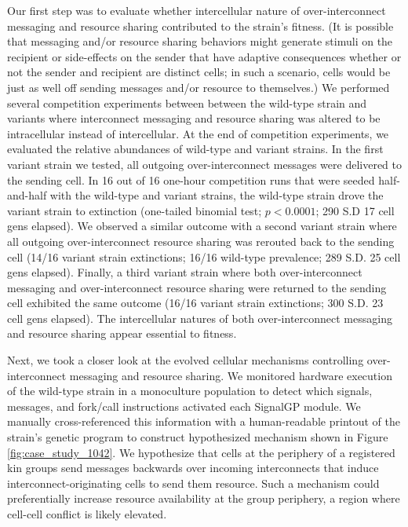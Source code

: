 Our first step was to evaluate whether intercellular nature of over-interconnect messaging and resource sharing contributed to the strain's fitness.
(It is possible that messaging and/or resource sharing behaviors might generate stimuli on the recipient or side-effects on the sender that have adaptive consequences whether or not the sender and recipient are distinct cells;
in such a scenario, cells would be just as well off sending messages and/or resource to themselves.)
We performed several competition experiments between between the wild-type strain and variants where interconnect messaging and resource sharing was altered to be intracellular instead of intercellular.
At the end of competition experiments, we evaluated the relative abundances of wild-type and variant strains.
In the first variant strain we tested, all outgoing over-interconnect messages were delivered to the sending cell.
In 16 out of 16 one-hour competition runs that were seeded half-and-half with the wild-type and variant strains, the wild-type strain drove the variant strain to extinction (one-tailed binomial test; $p < 0.0001$; 290 S.D 17 cell gens elapsed).
We observed a similar outcome with a second variant strain where all outgoing over-interconnect resource sharing was rerouted back to the sending cell (14/16 variant strain extinctions; 16/16 wild-type prevalence; 289 S.D. 25 cell gens elapsed).
Finally, a third variant strain where both over-interconnect messaging and over-interconnect resource sharing were returned to the sending cell exhibited the same outcome (16/16 variant strain extinctions; 300 S.D. 23 cell gens elapsed).
The intercellular natures of both over-interconnect messaging and resource sharing appear essential to fitness.

Next, we took a closer look at the evolved cellular mechanisms controlling over-interconnect messaging and resource sharing.
We monitored hardware execution of the wild-type strain in a monoculture population to detect which signals, messages, and fork/call instructions activated each SignalGP module.
We manually cross-referenced this information with a human-readable printout of the strain's genetic program to construct hypothesized mechanism shown in Figure \ref{fig:case_study_1042}.
We hypothesize that cells at the periphery of a registered kin groups send messages backwards over incoming interconnects that induce interconnect-originating cells to send them resource.
Such a mechanism could preferentially increase resource availability at the group periphery, a region where cell-cell conflict is likely elevated.

